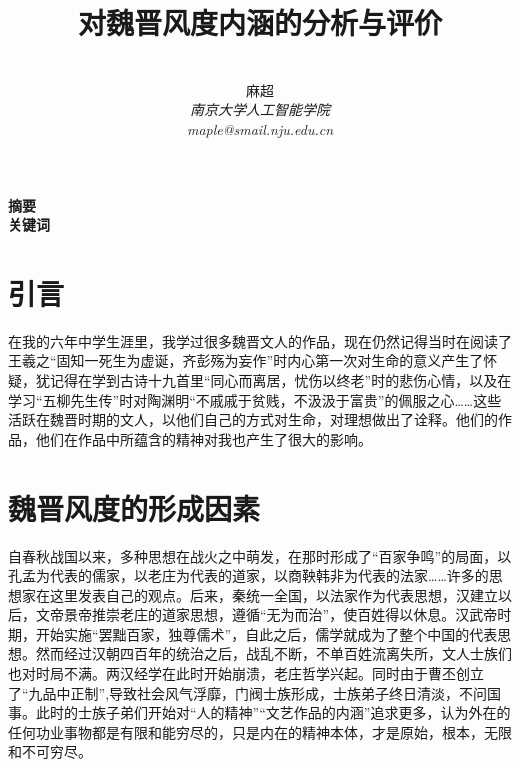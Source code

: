 \documentclass[12pt,a4paper]{ctexart}
\title{\textbf{对魏晋风度内涵的分析与评价}}
\author{
\\
\Large{麻超 \quad 201300066}
\\[6pt]
{ \large \textit{南京大学人工智能学院}}\\[2pt]\large \textit{maple@smail.nju.edu.cn}
}
\date{}
\newcommand{\supercite}[1]{\textsuperscript{\cite{#1}}}
\begin{document}
\maketitle
\setcounter{page}{1}
\textbf{摘要}  \\

\textbf{关键词}
\\[60pt]
\section{引言}
在我的六年中学生涯里，我学过很多魏晋文人的作品，现在仍然记得当时在阅读了王羲之“固知一死生为虚诞，齐彭殇为妄作”时内心第一次对生命的意义产生了怀疑，犹记得在学到古诗十九首里“同心而离居，忧伤以终老”时的悲伤心情，以及在学习“五柳先生传”时对陶渊明“不戚戚于贫贱，不汲汲于富贵”的佩服之心……这些活跃在魏晋时期的文人，以他们自己的方式对生命，对理想做出了诠释。他们的作品，他们在作品中所蕴含的精神对我也产生了很大的影响。
\section{魏晋风度的形成因素}
自春秋战国以来，多种思想在战火之中萌发，在那时形成了“百家争鸣”的局面，以孔孟为代表的儒家，以老庄为代表的道家，以商鞅韩非为代表的法家……许多的思想家在这里发表自己的观点。后来，秦统一全国，以法家作为代表思想，汉建立以后，文帝景帝推崇老庄的道家思想，遵循“无为而治”，使百姓得以休息。汉武帝时期，开始实施“罢黜百家，独尊儒术”，自此之后，儒学就成为了整个中国的代表思想。然而经过汉朝四百年的统治之后，战乱不断，不单百姓流离失所，文人士族们也对时局不满。两汉经学在此时开始崩溃，老庄哲学兴起。同时由于曹丕创立了“九品中正制”\supercite{1},导致社会风气浮靡，门阀士族形成，士族弟子终日清淡，不问国事。此时的士族子弟们开始对“人的精神”“文艺作品的内涵”追求更多，认为外在的任何功业事物都是有限和能穷尽的，只是内在的精神本体，才是原始，根本，无限和不可穷尽\supercite{2}。
\end{document}
